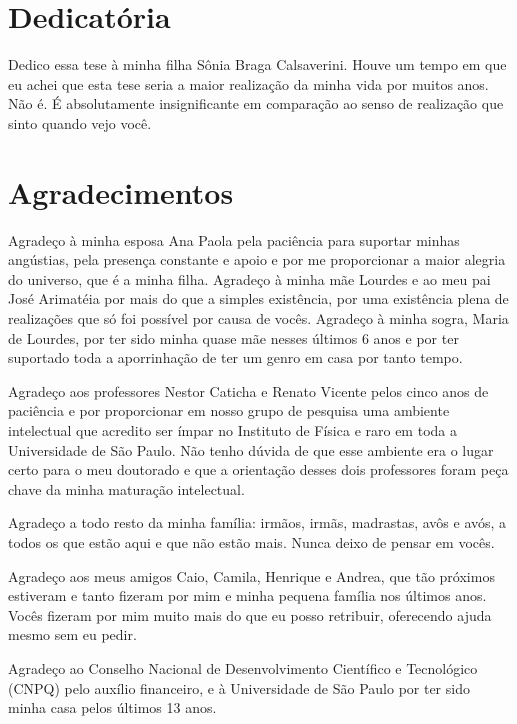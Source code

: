 \begin{titlepage}

\chapter*{Dedicatória}

Dedico essa tese à minha filha Sônia Braga Calsaverini. Houve um tempo em que eu achei que esta tese seria a maior realização da minha vida por muitos anos. Não é. É absolutamente insignificante em comparação ao senso de realização que sinto quando vejo você.

\chapter*{Agradecimentos}

Agradeço à minha esposa Ana Paola pela paciência para suportar minhas angústias, pela presença constante e apoio e por me proporcionar a maior alegria do universo, que é a minha filha. Agradeço à minha mãe Lourdes e ao meu pai José Arimatéia por mais do que a simples existência, por uma existência plena de realizações que só foi possível por causa de vocês. Agradeço à minha sogra, Maria de Lourdes, por ter sido minha quase mãe nesses últimos 6 anos e por ter suportado toda a aporrinhação de ter um genro em casa por tanto tempo.

Agradeço aos professores Nestor Caticha e Renato Vicente pelos cinco anos de paciência e por proporcionar em nosso grupo de pesquisa uma ambiente intelectual que acredito ser ímpar no Instituto de Física e raro em toda a Universidade de São Paulo. Não tenho dúvida de que esse ambiente era o lugar certo para o meu doutorado e que a orientação desses dois professores foram peça chave da minha maturação intelectual. 

Agradeço a todo resto da minha família: irmãos, irmãs, madrastas, avôs e avós, a todos os que estão aqui e que não estão mais. Nunca deixo de pensar em vocês. 

Agradeço aos meus amigos Caio, Camila, Henrique e Andrea, que tão próximos estiveram e tanto fizeram por mim e minha pequena família nos últimos anos. Vocês fizeram por mim muito mais do que eu posso retribuir, oferecendo ajuda mesmo sem eu pedir.

Agradeço ao Conselho Nacional de Desenvolvimento Científico e Tecnológico (CNPQ) pelo auxílio financeiro, e à Universidade de São Paulo por ter sido minha casa pelos últimos 13 anos. 

\end{titlepage}